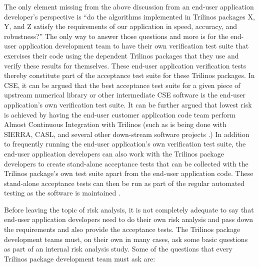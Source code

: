 \documentclass[11pt]{SANDreport}
\begin{document}
The only element missing from the above discussion from an end-user
application developer's perspective is ``do the algorithms implemented
in Trilinos packages X, Y, and Z satisfy the requirements of our
application in speed, accuracy, and robustness?''  The only way to
answer those questions and more is for the end-user application
development team to have their own verification test suite that
exercises their code using the dependent Trilinos packages that they
use and verify these results for themselves.  These end-user
application verification tests thereby constitute part of the
acceptance test suite for these Trilinos packages.  In CSE, it can be
argued that the best acceptance test suite for a given piece of
upstream numerical library or other intermediate CSE software is the
end-user application's own verification test suite.  It can be further
argued that lowest risk is achieved by having the end-user customer
application code team perform Almost Continuous Integration with
Trilinos (such as is being done with SIERRA, CASL, and several other
down-stream software projects {}\cite{SoftwareIntegrationforCSE09}.)
In addition to frequently running the end-user application's own
verification test suite, the end-user application developers can also
work with the Trilinos package developers to create stand-alone
acceptance tests that can be collected with the Trilinos package's own
test suite apart from the end-user application code.  These
stand-alone acceptance tests can then be run as part of the regular
automated testing as the software is maintained
{}\cite{DomainDrivenDesign}.

Before leaving the topic of risk analysis, it is not completely
adequate to say that end-user application developers need to do their
own risk analysis and pass down the requirements and also provide the
acceptance tests.  The Trilinos package development teams must, on
their own in many cases, ask some basic questions as part of an
internal risk analysis study.  Some of the questions that every
Trilinos package development team must ask are:
\end{document}
